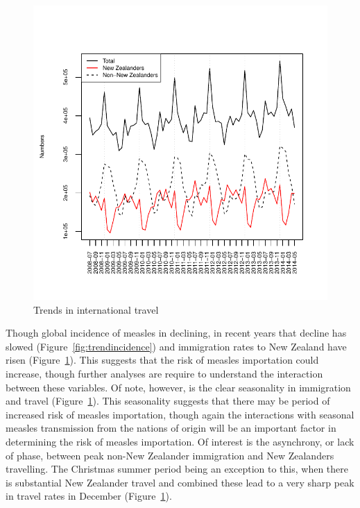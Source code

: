 \documentclass{article}
\begin{document}
\begin{itemize}
\begin{figure}
     \begin{center}
     \includegraphics[width=1\textwidth]{nzers.pdf}
     \end{center}
     \caption{Trends in international travel}
     \label{fig:travel}
\end{figure}

Though global incidence of measles in declining, in recent years that decline has slowed (Figure~\ref{fig:trendincidence}) and immigration rates to New Zealand have risen (Figure~\ref{fig:travel}). This suggests that the risk of measles importation could increase, though further analyses are require to understand the interaction between these variables.  Of note, however, is the clear seasonality in immigration and travel (Figure~\ref{fig:travel}).  This seasonality suggests that there may be period of increased risk of measles importation, though again the interactions with seasonal measles transmission from the nations of origin will be an important factor in determining the risk of measles importation. Of interest is the asynchrony, or lack of phase, between peak non-New Zealander immigration and New Zealanders travelling. The Christmas summer period being an exception to this, when there is substantial New Zealander travel and combined these lead to a very sharp peak in travel rates in December (Figure~\ref{fig:travel}).


\end{itemize}
\end{document}
